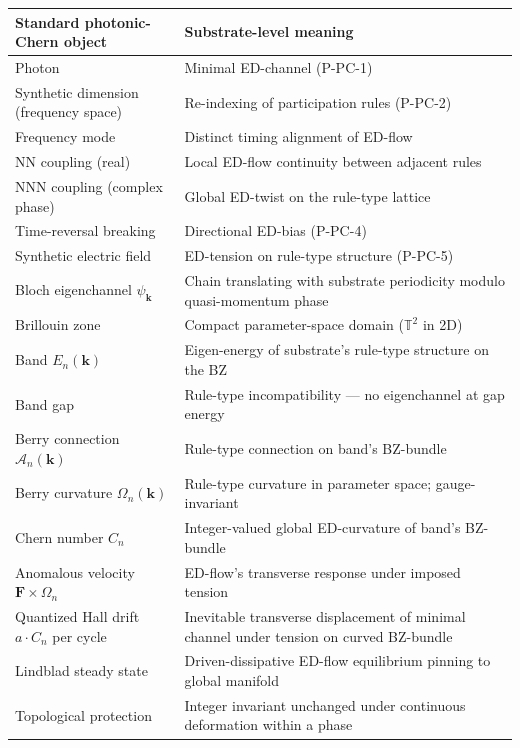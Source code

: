 \documentclass[11pt,a4paper]{article}
\begin{document}
\begin{center}
\footnotesize
\begin{tabular}{@{}p{5.5cm}p{9cm}@{}}
\toprule
Standard photonic-Chern object & Substrate-level meaning \\
\midrule
Photon & Minimal ED-channel (P-PC-1) \\
Synthetic dimension (frequency space) & Re-indexing of participation rules (P-PC-2) \\
Frequency mode & Distinct timing alignment of ED-flow \\
NN coupling (real) & Local ED-flow continuity between adjacent rules \\
NNN coupling (complex phase) & Global ED-twist on the rule-type lattice \\
Time-reversal breaking & Directional ED-bias (P-PC-4) \\
Synthetic electric field & ED-tension on rule-type structure (P-PC-5) \\
Bloch eigenchannel $\psi_\mathbf{k}$ & Chain translating with substrate periodicity modulo quasi-momentum phase \\
Brillouin zone & Compact parameter-space domain ($\mathbb{T}^2$ in 2D) \\
Band $E_n(\mathbf{k})$ & Eigen-energy of substrate's rule-type structure on the BZ \\
Band gap & Rule-type incompatibility --- no eigenchannel at gap energy \\
Berry connection $\mathcal{A}_n(\mathbf{k})$ & Rule-type connection on band's BZ-bundle \\
Berry curvature $\Omega_n(\mathbf{k})$ & Rule-type curvature in parameter space; gauge-invariant \\
Chern number $C_n$ & Integer-valued global ED-curvature of band's BZ-bundle \\
Anomalous velocity $\mathbf{F}\times\Omega_n$ & ED-flow's transverse response under imposed tension \\
Quantized Hall drift $a\cdot C_n$ per cycle & Inevitable transverse displacement of minimal channel under tension on curved BZ-bundle \\
Lindblad steady state & Driven-dissipative ED-flow equilibrium pinning to global manifold \\
Topological protection & Integer invariant unchanged under continuous deformation within a phase \\
\bottomrule
\end{tabular}
\end{center}
\end{document}
